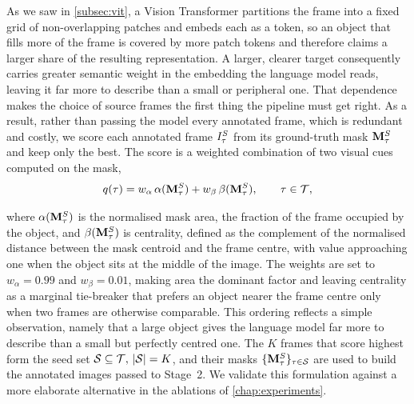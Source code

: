 \newpage
\noindent As we saw in \cref{subsec:vit}, a Vision Transformer partitions the frame into a fixed grid of non-overlapping patches and embeds each as a token, so an object that fills more of the frame is covered by more patch tokens and therefore claims a larger share of the resulting representation. A larger, clearer target consequently carries greater semantic weight in the embedding the language model reads, leaving it far more to describe than a small or peripheral one. That dependence makes the choice of source frames the first thing the pipeline must get right. As a result, rather than passing the model every annotated frame, which is redundant and costly, we score each annotated frame $I^S_\tau$ from its ground-truth mask $\mathbf{M}^S_\tau$ and keep only the best. The score is a weighted combination of two visual cues computed on the mask,
\begin{equation}
  q(\tau) = w_\alpha \, \alpha(\mathbf{M}^S_\tau) + w_\beta \, \beta(\mathbf{M}^S_\tau),
  \qquad \tau \in \mathcal{T},
  \label{eq:frame-score}
\end{equation}

where $\alpha(\mathbf{M}^S_\tau)$ is the normalised mask area, the fraction of the frame occupied by the object, and $\beta(\mathbf{M}^S_\tau)$ is centrality, defined as the complement of the normalised distance between the mask centroid and the frame centre, with value approaching one when the object sits at the middle of the image. The weights are set to $w_\alpha = 0.99$ and $w_\beta = 0.01$, making area the dominant factor and leaving centrality as a marginal tie-breaker that prefers an object nearer the frame centre only when two frames are otherwise comparable. This ordering reflects a simple observation, namely that a large object gives the language model far more to describe than a small but perfectly centred one. The $K$ frames that score highest form the seed set $\mathcal{S} \subseteq \mathcal{T},\,\left|\mathcal{S}\right|=K$, and their masks $\{\mathbf{M}^S_\tau\}_{\tau \in \mathcal{S}}$ are used to build the annotated images passed to Stage~2. We validate this formulation against a more elaborate alternative in the ablations of \cref{chap:experiments}. 

